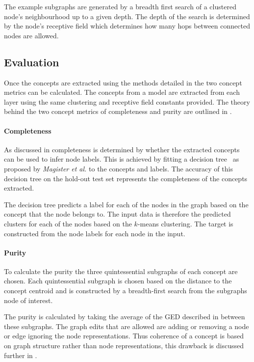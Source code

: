 The example subgraphs are generated by a breadth first search of a clustered node's neighbourhood up to a given depth.
The depth of the search is determined by the node's receptive field which determines how many hops between connected nodes are allowed.

\subsection{Evaluation}
\label{sec:concept-eval}

Once the concepts are extracted using the methods detailed in  the two concept metrics can be calculated.
The concepts from a model are extracted from each layer using the same clustering and receptive field constants provided.
The theory behind the two concept metrics of completeness and purity are outlined in .

\paragraph{Completeness}
As discussed in  completeness is determined by whether the extracted concepts can be used to infer node labels.
This is achieved by fitting a decision tree~\cite{kazhdan2020now} as proposed by \textit{Magister et al.}\cite{magister2021gcexplainer} to the concepts and labels.
The accuracy of this decision tree on the hold-out test set represents the completeness of the concepts extracted.

The decision tree predicts a label for each of the nodes in the graph based on the concept that the node belongs to.
The input data is therefore the predicted clusters for each of the nodes based on the $k$-means clustering.
The target is constructed from the node labels for each node in the input.

\paragraph{Purity}
To calculate the purity the three quintessential subgraphs of each concept are chosen.
Each quintessential subgraph is chosen based on the distance to the concept centroid and is constructed by a breadth-first search from the subgraphs node of interest.

The purity is calculated by taking the average of the GED described in  between these subgraphs.
The graph edits that are allowed are adding or removing a node or edge ignoring the node representations.
Thus coherence of a concept is based on graph structure rather than node representations, this drawback is discussed further in .

